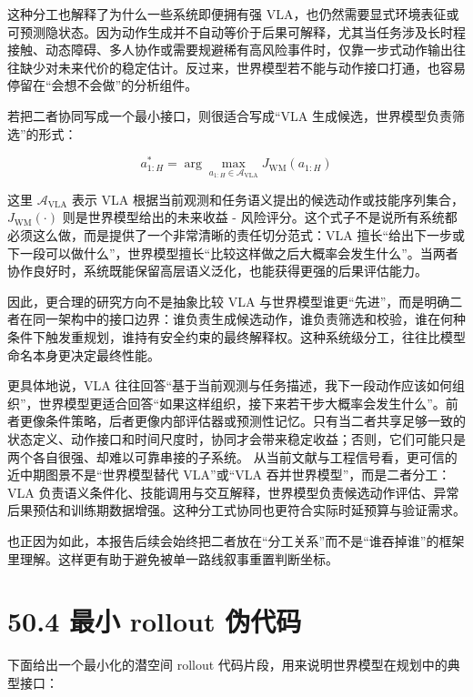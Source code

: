 这种分工也解释了为什么一些系统即便拥有强 VLA，也仍然需要显式环境表征或可预测隐状态。因为动作生成并不自动等价于后果可解释，尤其当任务涉及长时程接触、动态障碍、多人协作或需要规避稀有高风险事件时，仅靠一步式动作输出往往缺少对未来代价的稳定估计。反过来，世界模型若不能与动作接口打通，也容易停留在“会想不会做”的分析组件。

若把二者协同写成一个最小接口，则很适合写成“VLA 生成候选，世界模型负责筛选”的形式：

\begingroup
\footnotesize
\begin{equation*}
a_{1:H}^{*} =
\arg\max_{a_{1:H} \in \mathcal{A}_{\mathrm{VLA}}}
J_{\mathrm{WM}}(a_{1:H})
\end{equation*}
\endgroup

这里 \(\mathcal{A}_{\mathrm{VLA}}\) 表示 VLA 根据当前观测和任务语义提出的候选动作或技能序列集合，\(J_{\mathrm{WM}}(\cdot)\) 则是世界模型给出的未来收益 - 风险评分。这个式子不是说所有系统都必须这么做，而是提供了一个非常清晰的责任切分范式：VLA 擅长“给出下一步或下一段可以做什么”，世界模型擅长“比较这样做之后大概率会发生什么”。当两者协作良好时，系统既能保留高层语义泛化，也能获得更强的后果评估能力。

因此，更合理的研究方向不是抽象比较 VLA 与世界模型谁更“先进”，而是明确二者在同一架构中的接口边界：谁负责生成候选动作，谁负责筛选和校验，谁在何种条件下触发重规划，谁持有安全约束的最终解释权。这种系统级分工，往往比模型命名本身更决定最终性能。

更具体地说，VLA 往往回答“基于当前观测与任务描述，我下一段动作应该如何组织”，世界模型更适合回答“如果这样组织，接下来若干步大概率会发生什么”。前者更像条件策略，后者更像内部评估器或预测性记忆。只有当二者共享足够一致的状态定义、动作接口和时间尺度时，协同才会带来稳定收益；否则，它们可能只是两个各自很强、却难以可靠串接的子系统。 从当前文献与工程信号看，更可信的近中期图景不是“世界模型替代 VLA”或“VLA 吞并世界模型”，而是二者分工：VLA 负责语义条件化、技能调用与交互解释，世界模型负责候选动作评估、异常后果预估和训练期数据增强。这种分工式协同也更符合实际时延预算与验证需求。

也正因为如此，本报告后续会始终把二者放在“分工关系”而不是“谁吞掉谁”的框架里理解。这样更有助于避免被单一路线叙事重置判断坐标。

\section*{50.4 最小 rollout 伪代码}


下面给出一个最小化的潜空间 rollout 代码片段，用来说明世界模型在规划中的典型接口：

